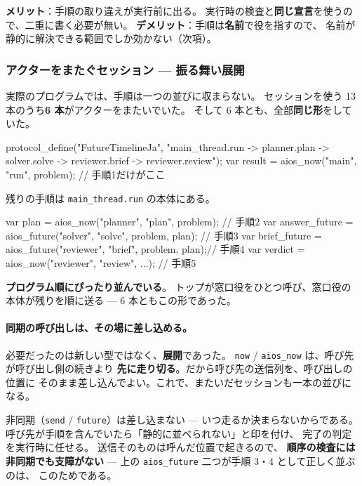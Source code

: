 \documentclass[11pt,a4paper]{ltjsarticle}
\theoremstyle{definition}
\theoremstyle{remark}
\begin{document}
\textbf{メリット}：手順の取り違えが実行前に出る。
実行時の検査と\textbf{同じ宣言}を使うので、二重に書く必要が無い。
\textbf{デメリット}：手順は\textbf{名前}で役を指すので、
名前が静的に解決できる範囲でしか効かない（次項）。

\subsubsection*{アクターをまたぐセッション --- 振る舞い展開}

\label{sec:crosssession}

実際のプログラムでは、手順は一つの並びに収まらない。
セッションを使う 13 本のうち\textbf{6 本}がアクターをまたいでいた。
そして 6 本とも、全部\textbf{同じ形}をしていた。

\begin{aipl}
protocol_define("FutureTimelineJa",
  "main_thread.run -> planner.plan -> solver.solve
   -> reviewer.brief -> reviewer.review");
var result = aios_now("main", "run", problem);      // 手順1だけがここ
\end{aipl}

残りの手順は \texttt{main\_thread.run} の本体にある。

\begin{aipl}
var plan          = aios_now("planner", "plan", problem);          // 手順2
var answer_future = aios_future("solver", "solve", problem, plan);  // 手順3
var brief_future  = aios_future("reviewer", "brief", problem, plan);// 手順4
var verdict       = aios_now("reviewer", "review", ...);            // 手順5
\end{aipl}

\textbf{プログラム順にぴったり並んでいる}。
トップが窓口役をひとつ呼び、窓口役の本体が残りを順に送る ---
6 本ともこの形であった。

\paragraph{同期の呼び出しは、その場に差し込める。}
必要だったのは新しい型ではなく、\textbf{展開}であった。
\texttt{now} / \texttt{aios\_now} は、呼び先が呼び出し側の続きより
\textbf{先に走り切る}。だから呼び先の送信列を、呼び出しの位置に
そのまま差し込んでよい。これで、またいだセッションも一本の並びになる。

非同期（\texttt{send} / \texttt{future}）は差し込まない ---
いつ走るか決まらないからである。
呼び先が手順を含んでいたら「静的に並べられない」と印を付け、
完了の判定を実行時に任せる。
送信そのものは呼んだ位置で起きるので、
\textbf{順序の検査には非同期でも支障がない} ---
上の \texttt{aios\_future} 二つが手順 3・4 として正しく並ぶのは、
このためである。
\end{document}
